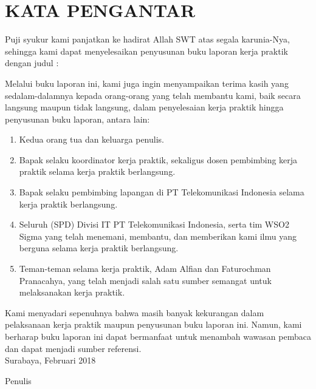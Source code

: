 \chapter{KATA PENGANTAR}
\indent\indent Puji syukur kami panjatkan ke hadirat Allah SWT atas segala karunia-Nya, sehingga kami dapat menyelesaikan penyusunan buku laporan kerja praktik dengan judul :
\begin{center}
	\textbf{\judul}
\end{center}

Melalui buku laporan ini, kami juga ingin menyampaikan terima kasih yang sedalam-dalamnya kepada orang-orang yang telah membantu kami, baik secara langsung maupun tidak langsung, dalam penyelesaian kerja praktik hingga penyusunan buku laporan, antara lain:
\begin{enumerate}
\item Kedua orang tua dan keluarga penulis.
\item Bapak \pembimbingDept selaku koordinator kerja praktik, sekaligus dosen pembimbing kerja praktik selama kerja praktik berlangsung.
\item Bapak \pembimbingLap selaku pembimbing lapangan di PT Telekomunikasi Indonesia selama kerja praktik berlangsung.
\item Seluruh \jabatanPembimbingLap (SPD) Divisi IT PT Telekomunikasi Indonesia, serta tim WSO2 Sigma yang telah menemani, membantu, dan memberikan kami ilmu yang berguna selama kerja praktik berlangsung. 
\item Teman-teman selama kerja praktik, Adam Alfian dan Faturochman Pranacahya, yang telah menjadi salah satu sumber semangat untuk melaksanakan kerja praktik.
\end{enumerate}
\indent\indent Kami menyadari sepenuhnya bahwa masih banyak kekurangan dalam pelaksanaan kerja praktik maupun penyusunan buku laporan ini. Namun, kami berharap buku laporan ini dapat bermanfaat untuk menambah wawasan pembaca dan dapat menjadi sumber referensi.\\

\hfill Surabaya, Februari 2018 \\ 

\begin{flushright}
\hfill{Penulis} 
\end{flushright}
\cleardoublepage
